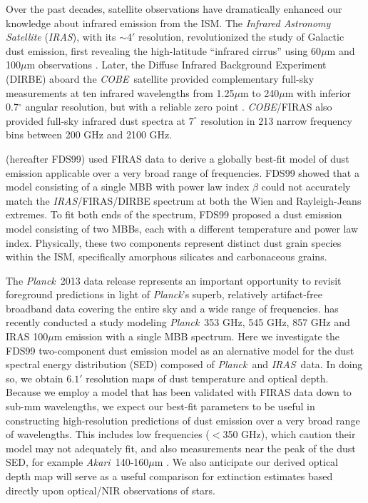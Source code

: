 \documentclass{emulateapj}
\newcommand{\IRAS}{{\it IRAS}}
\newcommand{\PLANCK}{{\it Planck}}
\newcommand{\AKARI}{{\it Akari}}
\newcommand{\COBE}{{\it COBE}}
\begin{document}
Over the past decades, satellite observations have dramatically enhanced our
knowledge about infrared emission from the ISM. The \textit{Infrared Astronomy 
Satellite} (\IRAS), with its $\sim$4$'$ resolution, revolutionized the study of
 Galactic dust emission, first revealing the high-latitude ``infrared cirrus'' 
using 60$\mu$m and 100$\mu$m observations \citep{low84, wheelock94}. Later, the
Diffuse Infrared Background Experiment (DIRBE) aboard the \COBE~satellite 
provided complementary full-sky measurements at ten infrared wavelengths from 
1.25$\mu$m to 240$\mu$m with inferior 0.7$^{\circ}$ angular resolution, but 
with a reliable zero point \citep{boggess92}. \COBE/FIRAS \citep{firas} also 
provided full-sky infrared dust spectra at $7^{\circ}$ resolution in 213 narrow
frequency bins between 200 GHz and 2100 GHz.

\cite{FDS99} (hereafter FDS99) used FIRAS data to derive a globally best-fit 
model of dust emission applicable over a very broad range of frequencies. 
FDS99 showed that a model consisting of a single MBB with power law index 
$\beta$ could not accurately match the \IRAS/FIRAS/DIRBE spectrum at both the 
Wien and Rayleigh-Jeans extremes. To fit both ends of the spectrum, FDS99 
proposed a dust emission model consisting of two MBBs, each with a different
temperature and power law index. Physically, these two components
represent distinct dust grain species within the ISM, specifically 
amorphous silicates and carbonaceous grains.


The \PLANCK~2013 data release \citep{planck2013} represents an important 
opportunity to revisit foreground predictions in light of \PLANCK's superb, 
relatively artifact-free broadband data covering the entire sky and a wide 
range of frequencies. \cite{planckdust} has recently conducted a study modeling
\PLANCK~353 GHz, 545 GHz, 857 GHz and IRAS 100$\mu$m emission with a single
MBB spectrum. Here we investigate the FDS99 two-component dust emission model 
as an alernative model for the dust spectral energy distribution (SED) composed
 of \PLANCK~and \IRAS~data. In doing so, we obtain $6.1'$ resolution maps of 
dust temperature and optical depth. Because we employ a model that has been 
validated with FIRAS data down to sub-mm wavelengths, we expect our best-fit 
parameters to be useful in constructing high-resolution predictions of dust 
emission over a very broad range of wavelengths. This includes low frequencies 
($<$350 GHz), which \cite{planckdust} caution their model may not adequately 
fit, and also measurements near the peak of the dust SED, for example 
\AKARI~140-160$\mu$m \citep{akari}. We also anticipate our derived optical 
depth map will serve as a useful comparison for extinction estimates based 
directly upon optical/NIR observations of stars.
\end{document}
